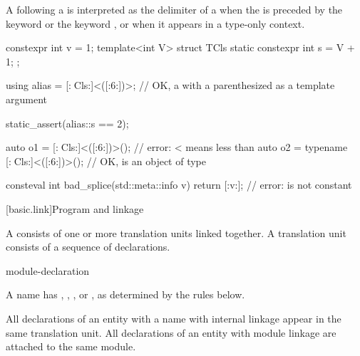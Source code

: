 \pnum
\begin{note}
A \tcode{<} following a  is interpreted as
the delimiter of a 
when the  is preceded by
the keyword  or the keyword , or
when it appears in a type-only context.
\begin{example}
\begin{codeblock}
constexpr int v = 1;
template<int V> struct TCls {
  static constexpr int s = V + 1;
};

using alias = [:^^TCls:]<([:^^v:])>;
  // OK, a  with a parenthesized  as a template argument

static_assert(alias::s == 2);

auto o1 = [:^^TCls:]<([:^^v:])>();              // error: < means less than
auto o2 = typename [:^^TCls:]<([:^^v:])>();     // OK,  is an object of type 

consteval int bad_splice(std::meta::info v) {
  return [:v:];                                 // error:  is not constant
}
\end{codeblock}
\end{example}
\end{note}

[basic.link]{Program and linkage}%

\pnum
{}%
%
A  consists of one or more translation units
linked together. A translation unit consists
of a sequence of declarations.

\begin{bnf}
\br
    \br
     module-declaration  
\end{bnf}

\pnum
{}%
A name has
,
,
, or
,
as determined by the rules below.
\begin{note}
All declarations of an entity with a name with internal linkage
appear in the same translation unit.
All declarations of an entity with module linkage
are attached to the same module.
\end{note}

